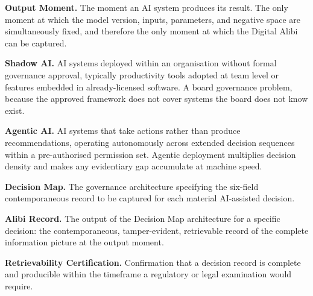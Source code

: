 \textbf{Output Moment.} The moment an AI system produces its result. The only moment at which the model version, inputs, parameters, and negative space are simultaneously fixed, and therefore the only moment at which the Digital Alibi can be captured.

\textbf{Shadow AI.} AI systems deployed within an organisation without formal governance approval, typically productivity tools adopted at team level or features embedded in already-licensed software. A board governance problem, because the approved framework does not cover systems the board does not know exist.

\textbf{Agentic AI.} AI systems that take actions rather than produce recommendations, operating autonomously across extended decision sequences within a pre-authorised permission set. Agentic deployment multiplies decision density and makes any evidentiary gap accumulate at machine speed.

\textbf{Decision Map.} The governance architecture specifying the six-field contemporaneous record to be captured for each material AI-assisted decision.

\textbf{Alibi Record.} The output of the Decision Map architecture for a specific decision: the contemporaneous, tamper-evident, retrievable record of the complete information picture at the output moment.

\textbf{Retrievability Certification.} Confirmation that a decision record is complete and producible within the timeframe a regulatory or legal examination would require.

